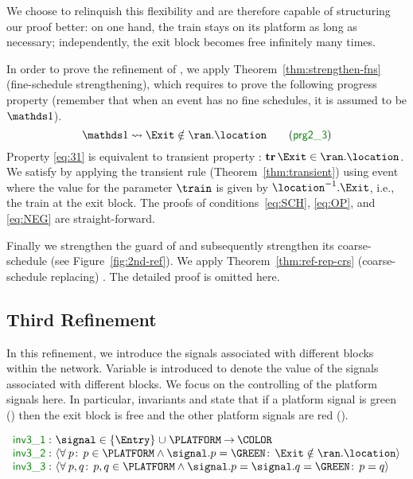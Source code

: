 We choose to relinquish this flexibility and are therefore capable of structuring
our proof better: on one hand, the train stays on its platform as
long as necessary; independently, the exit block becomes free
infinitely many times. 

In order to prove the refinement of \moveout, we apply
Theorem~\ref{thm:strengthen-fns} (fine-schedule strengthening), which
requires to prove the following progress property (remember that when
an event has no fine schedules, it is assumed to be $\one$).
\begin{equation}
  \label{eq:31}
  \one \leadsto \Exit \notin \ran.\location
  \tag{\Binv{prg2\_3}}
\end{equation}
Property
\ref{eq:31} is equivalent to transient property : $\tr
\Exit \in \ran.\location$.  We satisfy  by applying the
transient rule (Theorem~\ref{thm:transient}) using event \depart where
the value for the parameter $\train$ is given by
$\location^{-1}.\Exit$, i.e., the train at the exit block.  The
proofs of conditions~\ref{eq:SCH}, \ref{eq:OP}, and \ref{eq:NEG} are
straight-forward.

Finally we strengthen the guard of \movein and subsequently strengthen
its coarse-schedule (see Figure~\ref{fig:2nd-ref}).  We apply
Theorem~\ref{thm:ref-rep-crs} (coarse-schedule replacing) \movein.
The detailed proof is omitted here.

\subsection{Third Refinement}
\label{sec:third-refinement}


In this refinement, we introduce the signals associated with different
blocks within the network.  Variable \signal is introduced to denote
the value of the signals associated with different blocks.  We focus
on the controlling of the platform signals here.  In particular,
invariants  and  state that if a platform signal is
green (\GREEN) then the exit block is free and the other platform
signals are red (\RED).
  \begin{Bcode}[\footnotesize]
    $ \invariants[false]{ \Binv{inv3\_1}: & \signal \in \{\Entry\}
      \bunion \PLATFORM \tfun
      \COLOR \\
      \Binv{inv3\_2}: & \qforall{p}{p \in \PLATFORM \land \signal.p =
        \GREEN}{\Exit \notin \ran.\location} \\
      \Binv{inv3\_3}: & \qforall{p,q}{p, q \in \PLATFORM \land
        \signal.p = \signal.q = \GREEN}{p = q} } $
  \end{Bcode}

